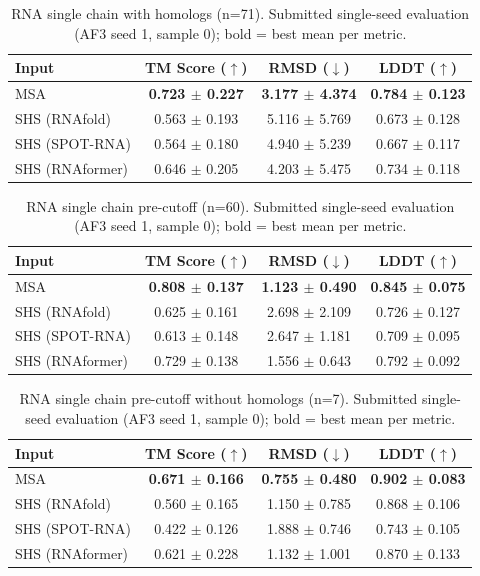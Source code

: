 \begin{table}[htbp]
\centering
\caption{RNA single chain with homologs (n=71). Submitted single-seed evaluation (AF3 seed 1, sample 0); bold = best mean per metric.}
\label{tab:rna_single_chain_with_homologs}
\begin{tabular}{lccc}
\toprule
Input & TM Score ($\uparrow$) & RMSD ($\downarrow$) & LDDT ($\uparrow$) \\
\midrule
MSA & \textbf{0.723 $\pm$ 0.227} & \textbf{3.177 $\pm$ 4.374} & \textbf{0.784 $\pm$ 0.123} \\
SHS (RNAfold) & 0.563 $\pm$ 0.193 & 5.116 $\pm$ 5.769 & 0.673 $\pm$ 0.128 \\
SHS (SPOT-RNA) & 0.564 $\pm$ 0.180 & 4.940 $\pm$ 5.239 & 0.667 $\pm$ 0.117 \\
SHS (RNAformer) & 0.646 $\pm$ 0.205 & 4.203 $\pm$ 5.475 & 0.734 $\pm$ 0.118 \\
\bottomrule
\end{tabular}
\end{table}

\begin{table}[htbp]
\centering
\caption{RNA single chain pre-cutoff (n=60). Submitted single-seed evaluation (AF3 seed 1, sample 0); bold = best mean per metric.}
\label{tab:rna_single_chain_pre_cutoff}
\begin{tabular}{lccc}
\toprule
Input & TM Score ($\uparrow$) & RMSD ($\downarrow$) & LDDT ($\uparrow$) \\
\midrule
MSA & \textbf{0.808 $\pm$ 0.137} & \textbf{1.123 $\pm$ 0.490} & \textbf{0.845 $\pm$ 0.075} \\
SHS (RNAfold) & 0.625 $\pm$ 0.161 & 2.698 $\pm$ 2.109 & 0.726 $\pm$ 0.127 \\
SHS (SPOT-RNA) & 0.613 $\pm$ 0.148 & 2.647 $\pm$ 1.181 & 0.709 $\pm$ 0.095 \\
SHS (RNAformer) & 0.729 $\pm$ 0.138 & 1.556 $\pm$ 0.643 & 0.792 $\pm$ 0.092 \\
\bottomrule
\end{tabular}
\end{table}

\begin{table}[htbp]
\centering
\caption{RNA single chain pre-cutoff without homologs (n=7). Submitted single-seed evaluation (AF3 seed 1, sample 0); bold = best mean per metric.}
\label{tab:rna_single_chain_pre_cutoff_without_homologs}
\begin{tabular}{lccc}
\toprule
Input & TM Score ($\uparrow$) & RMSD ($\downarrow$) & LDDT ($\uparrow$) \\
\midrule
MSA & \textbf{0.671 $\pm$ 0.166} & \textbf{0.755 $\pm$ 0.480} & \textbf{0.902 $\pm$ 0.083} \\
SHS (RNAfold) & 0.560 $\pm$ 0.165 & 1.150 $\pm$ 0.785 & 0.868 $\pm$ 0.106 \\
SHS (SPOT-RNA) & 0.422 $\pm$ 0.126 & 1.888 $\pm$ 0.746 & 0.743 $\pm$ 0.105 \\
SHS (RNAformer) & 0.621 $\pm$ 0.228 & 1.132 $\pm$ 1.001 & 0.870 $\pm$ 0.133 \\
\bottomrule
\end{tabular}
\end{table}

